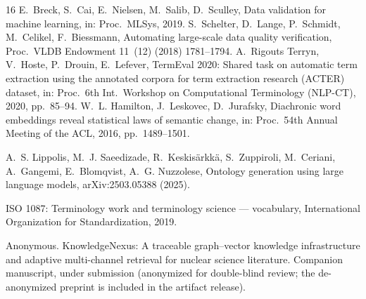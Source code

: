 \documentclass[preprint,12pt]{elsarticle}
\begin{document}
\begin{thebibliography}{16}
 E.~Breck, S.~Cai, E.~Nielsen, M.~Salib, D.~Sculley, Data
validation for machine learning, in: Proc.\ MLSys, 2019.
 S.~Schelter, D.~Lange, P.~Schmidt, M.~Celikel,
F.~Biessmann, Automating large-scale data quality verification,
Proc.\ VLDB Endowment 11~(12) (2018) 1781--1794.
 A.~Rigouts Terryn, V.~Hoste, P.~Drouin, E.~Lefever,
TermEval 2020: Shared task on automatic term extraction using the
annotated corpora for term extraction research (ACTER) dataset, in:
Proc.\ 6th Int.\ Workshop on Computational Terminology (NLP-CT), 2020,
pp.\ 85--94.
 W.~L. Hamilton, J.~Leskovec, D.~Jurafsky,
Diachronic word embeddings reveal statistical laws of semantic change,
in: Proc.\ 54th Annual Meeting of the ACL, 2016, pp.\ 1489--1501.

 A.~S. Lippolis, M.~J. Saeedizade, R.~Keskis{\"a}rkk{\"a},
S.~Zuppiroli, M.~Ceriani, A.~Gangemi, E.~Blomqvist, A.~G. Nuzzolese,
Ontology generation using large language models, arXiv:2503.05388 (2025).

 ISO 1087: Terminology work and terminology science ---
vocabulary, International Organization for Standardization, 2019.

 Anonymous. KnowledgeNexus: A traceable graph--vector
knowledge infrastructure and adaptive multi-channel retrieval for nuclear
science literature. Companion manuscript, under submission (anonymized
for double-blind review; the de-anonymized preprint is included in the
artifact release).

\end{thebibliography}
\end{document}
